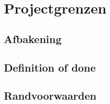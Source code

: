 \chapter{Projectgrenzen}

\section{Afbakening}

\section{Definition of done}

\section{Randvoorwaarden}